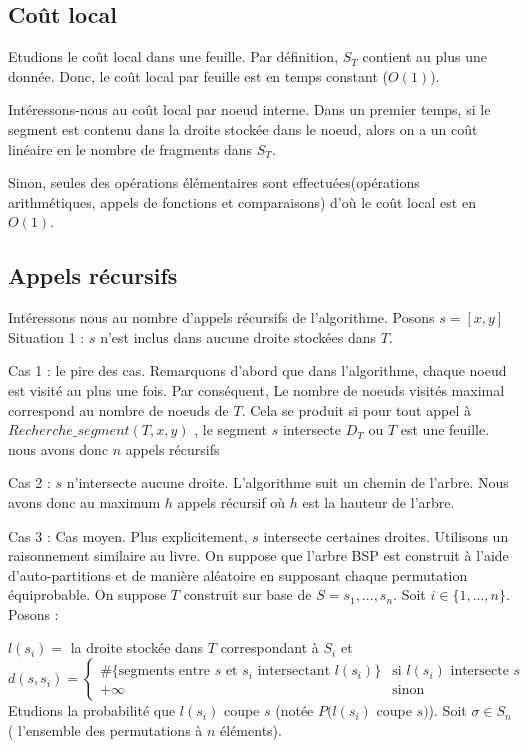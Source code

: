 \subsection{Coût local}

Etudions le coût local dans une feuille. Par définition, $S_T$ contient au plus une donnée.
Donc, le coût local par feuille est en temps constant ($O(1)$).

Intéressons-nous au coût local par noeud interne.
Dans un premier temps, si le segment est contenu dans la droite stockée dans le noeud,
alors on a un coût linéaire en le nombre de fragments dans $S_T$.

Sinon, seules des opérations élémentaires sont effectuées(opérations arithmétiques,
appels de fonctions et comparaisons) d'où le coût local est en $O(1)$.

\subsection{Appels récursifs}

Intéressons nous au nombre d'appels récursifs de l'algorithme.
Posons $s = [x,y]$
Situation 1 : $s$ n'est inclus dans aucune droite stockées dans $T$.

Cas 1 : le pire des cas.
Remarquons d'abord que dans l'algorithme, chaque noeud est visité au plus une fois.
Par conséquent, Le nombre de noeuds visités maximal correspond au nombre de noeuds de $T$.
Cela se produit si pour tout appel à $Recherche\_segment(T,x,y)$ , le segment $s$ intersecte
$D_T$ ou $T$ est une feuille. nous avons donc $n$ appels récursifs 

Cas 2 :  $s$ n'intersecte aucune droite.
L'algorithme suit un chemin de l'arbre. Nous avons donc
au maximum $h$ appels récursif où $h$ est la hauteur de l'arbre.

Cas 3 : Cas moyen. 
Plus explicitement, $s$ intersecte certaines droites. Utilisons un raisonnement similaire
au livre. On suppose que l'arbre BSP est construit à l'aide d'auto-partitions et de
manière aléatoire en supposant chaque permutation équiprobable.
On suppose $T$ construit sur base de $S = {s_1,...,s_n}$. Soit $ i \in \{1,...,n\}$.
Posons :

$l(s_i) =$ la droite stockée dans $T$ correspondant à $S_i$ et
$$ d(s,s_i )= \begin{cases} \mbox{\#\{segments entre } s \mbox{ et } s_i
\mbox{ intersectant } l(s_i) \mbox{\}}
&\mbox{si } l(s_i) \mbox { intersecte } s \\ +\infty & \mbox{sinon} \end{cases} $$
Etudions la probabilité que $l(s_i)$ coupe $s$ (notée $P(l(s_i)$ coupe $s)$).
Soit $\sigma  \in S_n $( l'ensemble des permutations à $n$ éléments).

